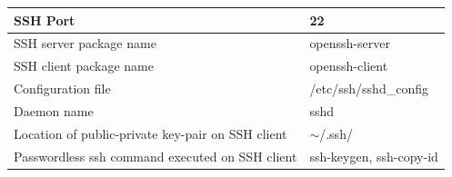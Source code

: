 \begin{flushleft}
	
	\begin{tabulary}{1.0\textwidth}{|p{14em}|p{14em}|}
		\toprule
		SSH Port & 22 \\
		\hline
		SSH server package name & openssh-server \\
		\hline
		SSH client package name & openssh-client \\
		\hline
		Configuration file & /etc/ssh/sshd\_config \\
		\hline
		Daemon name & sshd \\
		\hline
		Location of public-private key-pair on SSH client & $\sim$/.ssh/ \\
		\hline
		Passwordless ssh command executed on SSH client & ssh-keygen, ssh-copy-id \\
		\hline
	\end{tabulary}
	
	\label{tab:example} %

	
	
	
	

	

	
	


\end{flushleft}
\newpage


